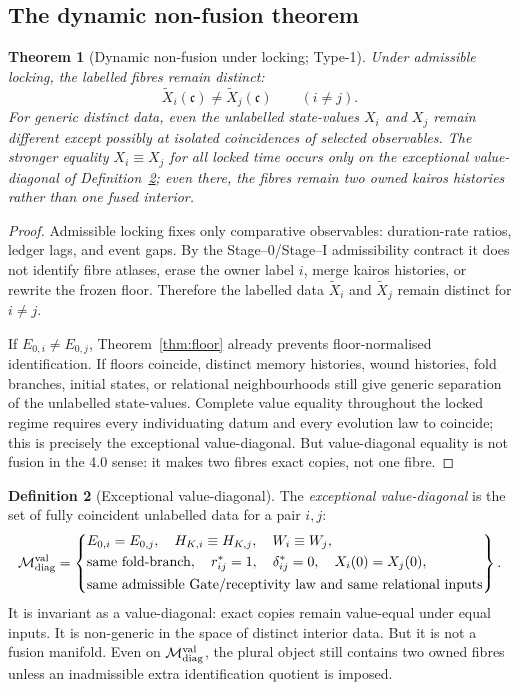 \documentclass[11pt,a4paper]{article}
\theoremstyle{definition}
\newtheorem{definition}{Definition}[section]
\theoremstyle{plain}
\newtheorem{theorem}[definition]{Theorem}
\theoremstyle{remark}
\begin{document}
\subsection{The dynamic non-fusion theorem}

\begin{theorem}[Dynamic non-fusion under locking; Type-1]\label{thm:dynnofusion}
Under admissible locking, the labelled fibres remain distinct:
\[
\widetilde X_i(\mathfrak c)\neq \widetilde X_j(\mathfrak c)
\qquad
(i\neq j).
\]
For generic distinct data, even the unlabelled state-values \(X_i\) and \(X_j\)
remain different except possibly at isolated coincidences of selected observables.
The stronger equality \(X_i\equiv X_j\) for all locked time occurs only on the
exceptional value-diagonal of Definition~\ref{def:diag}; even there, the fibres
remain two owned kairos histories rather than one fused interior.
\end{theorem}

\begin{proof}
Admissible locking fixes only comparative observables: duration-rate ratios,
ledger lags, and event gaps. By the Stage--0/Stage--I admissibility contract it
does not identify fibre atlases, erase the owner label \(i\), merge kairos
histories, or rewrite the frozen floor. Therefore the labelled data
\(\widetilde X_i\) and \(\widetilde X_j\) remain distinct for \(i\neq j\).

If \(E_{0,i}\neq E_{0,j}\), Theorem~\ref{thm:floor} already prevents
floor-normalised identification. If floors coincide, distinct memory histories,
wound histories, fold branches, initial states, or relational neighbourhoods still
give generic separation of the unlabelled state-values. Complete value equality
throughout the locked regime requires every individuating datum and every
evolution law to coincide; this is precisely the exceptional value-diagonal.
But value-diagonal equality is not fusion in the 4.0 sense: it makes two fibres
exact copies, not one fibre. \qedhere
\end{proof}

\begin{definition}[Exceptional value-diagonal]\label{def:diag}
The \emph{exceptional value-diagonal} is the set of fully coincident unlabelled
data for a pair \(i,j\):
\[
\mathcal M_{\mathrm{diag}}^{\rm val}
=
\left\{
\begin{aligned}
&E_{0,i}=E_{0,j},\quad
H_{K,i}\equiv H_{K,j},\quad
W_i\equiv W_j,\\
&\text{same fold-branch},\quad
r^*_{ij}=1,\quad
\delta^*_{ij}=0,\quad
X_i(0)=X_j(0),\\
&\text{same admissible Gate/receptivity law and same relational inputs}
\end{aligned}
\right\}.
\]
It is invariant as a value-diagonal: exact copies remain value-equal under equal
inputs. It is non-generic in the space of distinct interior data. But it is not a
fusion manifold. Even on
\(\mathcal M_{\mathrm{diag}}^{\rm val}\), the plural object still contains two
owned fibres unless an inadmissible extra identification quotient is imposed.
\end{definition}
\end{document}
